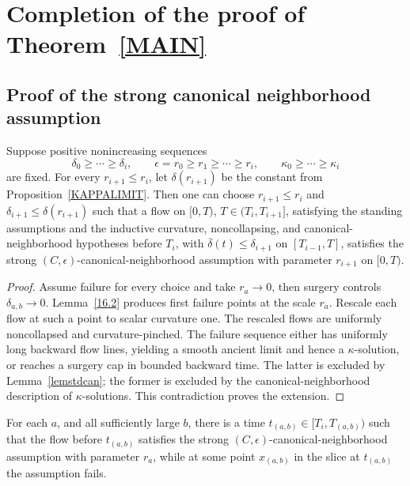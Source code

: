 \chapter{Completion of the proof of Theorem~{\ref{MAIN}}}

\section{Proof of the strong canonical neighborhood assumption}
\label{sectcannbhd}

\begin{proposition}
\label{prop:canonical-neighborhood-extends}
\label{extend}
Suppose positive nonincreasing sequences
\[
  \delta_0\geq\cdots\geq\delta_i,
  \qquad
  \epsilon=r_0\geq r_1\geq\cdots\geq r_i,
  \qquad
  \kappa_0\geq\cdots\geq\kappa_i
\]
are fixed. For every $r_{i+1}\leq r_i$, let $\delta(r_{i+1})$ be the constant
from Proposition~\ref{KAPPALIMIT}. Then one can choose
$r_{i+1}\leq r_i$ and $\delta_{i+1}\leq\delta(r_{i+1})$ such that a flow on
$[0,T)$, $T\in(T_i,T_{i+1}]$, satisfying the standing assumptions and the
inductive curvature, noncollapsing, and canonical-neighborhood hypotheses before
$T_i$, with $\overline\delta(t)\leq\delta_{i+1}$ on
$[T_{i-1},T]$, satisfies the strong $(C,\epsilon)$-canonical-neighborhood
assumption with parameter $r_{i+1}$ on $[0,T)$.
\end{proposition}

\begin{proof}
\sketch
{}
Assume failure for every choice and take $r_a\to0$, then surgery controls
$\delta_{a,b}\to0$. Lemma~\ref{16.2} produces first failure points at the
scale $r_a$. Rescale each flow at such a point to scalar curvature one. The
rescaled flows are uniformly noncollapsed and curvature-pinched. The failure
sequence either has uniformly long backward flow lines, yielding a smooth
ancient limit and hence a $\kappa$-solution, or reaches a surgery cap in bounded
backward time. The latter is excluded by Lemma~\ref{lemstdcan}; the former is
excluded by the canonical-neighborhood description of $\kappa$-solutions. This
contradiction proves the extension.
\end{proof}

\begin{lemma}
\label{lem:limit-canonical-neighborhood-fails-at-surgery-scale}
\label{16.2}
For each $a$, and all sufficiently large $b$, there is a time
$t_{(a,b)}\in[T_i,T_{(a,b)})$ such that the flow before $t_{(a,b)}$ satisfies
the strong $(C,\epsilon)$-canonical-neighborhood assumption with parameter
$r_a$, while at some point $x_{(a,b)}$ in the slice at $t_{(a,b)}$ the assumption
fails.
\end{lemma}

